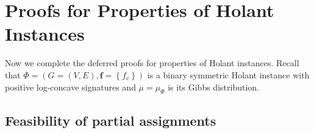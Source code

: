 \documentclass[11pt]{article}
\newcommand{\set}[1]{\left\{#1\right\}}
\newcommand{\vecf}{\boldsymbol{f}}
\begin{document}








\appendix

\section{Proofs for Properties of Holant Instances} \label{sec:proof-Holant-properties}

Now we complete the deferred proofs for properties of Holant instances. Recall that $\Phi = (G = (V, E), \vecf = \set{f_v})$ is a binary symmetric Holant instance with positive log-concave signatures and $\mu = \mu_\Phi$ is its Gibbs distribution.

\subsection{Feasibility of partial assignments}
\end{document}
